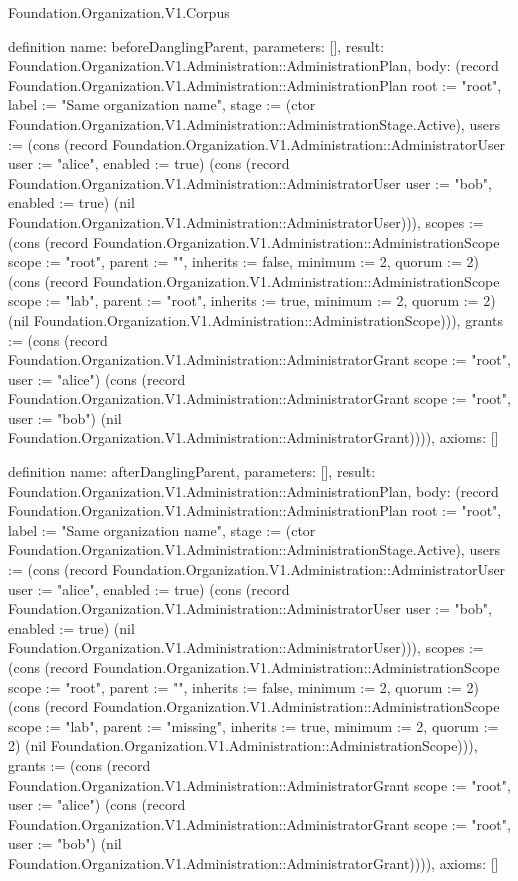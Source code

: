 \begin{lexlean}{Foundation.Organization.V1.Corpus}
\begin{semanticmodule}
definition{
  name: beforeDanglingParent,
  parameters: [],
  result: Foundation.Organization.V1.Administration::AdministrationPlan,
  body: (record Foundation.Organization.V1.Administration::AdministrationPlan {root := "root", label := "Same organization name", stage := (ctor Foundation.Organization.V1.Administration::AdministrationStage.Active), users := (cons (record Foundation.Organization.V1.Administration::AdministratorUser {user := "alice", enabled := true}) (cons (record Foundation.Organization.V1.Administration::AdministratorUser {user := "bob", enabled := true}) (nil Foundation.Organization.V1.Administration::AdministratorUser))), scopes := (cons (record Foundation.Organization.V1.Administration::AdministrationScope {scope := "root", parent := "", inherits := false, minimum := 2, quorum := 2}) (cons (record Foundation.Organization.V1.Administration::AdministrationScope {scope := "lab", parent := "root", inherits := true, minimum := 2, quorum := 2}) (nil Foundation.Organization.V1.Administration::AdministrationScope))), grants := (cons (record Foundation.Organization.V1.Administration::AdministratorGrant {scope := "root", user := "alice"}) (cons (record Foundation.Organization.V1.Administration::AdministratorGrant {scope := "root", user := "bob"}) (nil Foundation.Organization.V1.Administration::AdministratorGrant)))}),
  axioms: []
}

definition{
  name: afterDanglingParent,
  parameters: [],
  result: Foundation.Organization.V1.Administration::AdministrationPlan,
  body: (record Foundation.Organization.V1.Administration::AdministrationPlan {root := "root", label := "Same organization name", stage := (ctor Foundation.Organization.V1.Administration::AdministrationStage.Active), users := (cons (record Foundation.Organization.V1.Administration::AdministratorUser {user := "alice", enabled := true}) (cons (record Foundation.Organization.V1.Administration::AdministratorUser {user := "bob", enabled := true}) (nil Foundation.Organization.V1.Administration::AdministratorUser))), scopes := (cons (record Foundation.Organization.V1.Administration::AdministrationScope {scope := "root", parent := "", inherits := false, minimum := 2, quorum := 2}) (cons (record Foundation.Organization.V1.Administration::AdministrationScope {scope := "lab", parent := "missing", inherits := true, minimum := 2, quorum := 2}) (nil Foundation.Organization.V1.Administration::AdministrationScope))), grants := (cons (record Foundation.Organization.V1.Administration::AdministratorGrant {scope := "root", user := "alice"}) (cons (record Foundation.Organization.V1.Administration::AdministratorGrant {scope := "root", user := "bob"}) (nil Foundation.Organization.V1.Administration::AdministratorGrant)))}),
  axioms: []
}


\end{semanticmodule}
\end{lexlean}
